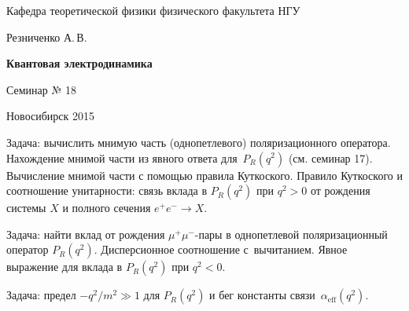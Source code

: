\documentclass[12pt,pagesize,paper=192mm:108mm]{scrbook}
\begin{document}
\begin{titlepage}
\begin{center}
    Кафедра теоретической физики физического факультета НГУ
    \medskip

    \Large
    Резниченко А.\,В.
    \bigskip

    \huge
    \textbf{Квантовая электродинамика}
    \bigskip

    \Large
    Семинар № 18
    \vfill

    \normalsize
    \vfill

    \normalsize \ccbysa\hspace{0.5em}  Новосибирск 2015
  \end{center}
\end{titlepage}
\newpage

\vspace*{-1em}
\begin{center}
\vfill
  \begin{minipage}{0.65\linewidth}

    Задача: вычислить мнимую часть (однопетлевого) поляризационного
    оператора. Нахождение мнимой части из явного ответа для~$P_R(q^2)$
    (см. семинар 17). Вычисление мнимой части с помощью правила
    Куткоского. Правило Куткоского и соотношение унитарности: связь
    вклада в $P_R(q^2)$ при $q^2>0$ от рождения системы $X$ и полного сечения
    $e^+e^-\to X$.
    \smallskip

    Задача: найти вклад от рождения $\mu^+\mu^-$-пары в однопетлевой
    поляризационный оператор $P_R(q^2)$. Дисперсионное соотношение
    с~вычитанием. Явное выражение для вклада в $P_R(q^2)$ при $q^2<0$.
    \smallskip

    Задача: предел $-q^2/m^2\gg 1$ для $P_R(q^2)$ и бег константы
    связи~$\alpha_{\text{eff}}(q^2)$.

  \end{minipage}
  \vfill

\end{center}
\end{document}
